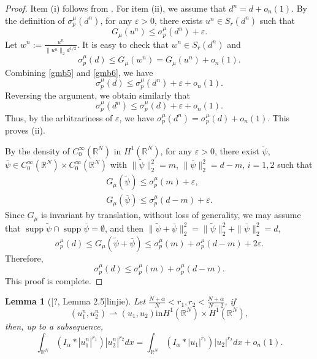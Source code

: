 \documentclass[10pt,a4paper]{amsart}
\numberwithin{equation}{section}
\newtheorem{lemma}[theo]{Lemma}
\begin{document}
\begin{proof}
Item (i) follows from \cite[Theorem 1.2]{ygg}. 
For item (ii), we assume that $d^n=d+o_n(1)$. By the definition of
$\sigma_p^{\mu}(d^n)$, for any $\varepsilon>0$, there exists $u^n\in
 S_r(d^n)$ such that
\begin{equation}\label{gmb5}
 G_\mu(u^n)\leq\sigma_p^{\mu}(d^n)+\varepsilon.
\end{equation}
Let $w^n:=\frac{u^n}{\| u^n \|_2d^{1/2}}$. It is
easy to check that $w^n\in S_r(d^n)$ and
\begin{equation}\label{gmb6}
 \sigma_p^{\mu}(d)\leq G_\mu(w^n)=G_\mu(u^n)+o_n(1).
\end{equation}
Combining \eqref{gmb5} and \eqref{gmb6}, we have
\[
 \sigma_p^{\mu}(d)\leq\sigma_p^{\mu}(d^n)+\varepsilon+o_n(1).
\]
Reversing the argument, we obtain similarly that
\[
\sigma_p^{\mu}(d^n)\leq\sigma_p^{\mu}(d)+\varepsilon+o_n(1).
\]
Thus, by the arbitrariness of $\varepsilon$, we have
$\sigma_p^{\mu}(d^n)=\sigma_p^{\mu}(d)+o_n(1)$. This proves (ii).

By the density of $C_0^{\infty}(\mathbb{R}^N)$ in $H^1(\mathbb{R}^N)$, 
for any $\varepsilon>0$, there exist $\tilde{\psi}$, $\bar{\psi}
 \in C_0^{\infty}(\mathbb{R}^N)\times C_0^{\infty}(\mathbb{R}^N)$ with 
$\| \tilde{\psi}\|_2^2=m$, $\| \bar{\psi}\|_2^2=d-m$,
$i=1,2$ such that
\begin{gather*}
G_\mu(\tilde{\psi})\leq\sigma_p^{\mu}(m)+\varepsilon,\\
G_\mu(\bar{\psi})\leq\sigma_p^{\mu}(d-m)+\varepsilon.
\end{gather*}
Since $G_\mu$ is invariant by translation, without loss of generality, we may assume 
that $\operatorname{supp}\tilde{\psi}\cap \operatorname{supp}\bar{\psi}=\emptyset$, 
and then
 $\| \tilde{\psi}+\bar{\psi}\|_2^2=\| \tilde{\psi}\|_2^2+\|\bar{\psi}\|_2^2=d$,
\[
 \sigma_p^{\mu}(d)\leq G_\mu(\tilde{\psi}+\bar{\psi})\leq\sigma_p^{\mu}(m)+
 \sigma_p^{\mu}(d-m)+2\varepsilon.
\]
Therefore,
\[
 \sigma_p^{\mu}(d)\leq\sigma_p^{\mu}(m)+\sigma_p^{\mu}(d-m).
\]
This proof is complete.
\end{proof}


\begin{lemma}[{[?, Lemma 2.5]linjie}] \label{ph2}
Let $\frac{N+\alpha}{N}<r_1,r_2<\frac{N+\alpha}{N-2}$, if
\[
(u_1^n,u_2^n)\rightharpoonup(u_1,u_2) \text{in} H^1(\mathbb{R}^N)\times H^1(\mathbb{R}^N),
\]
then, up to a subsequence,
\begin{equation}\label{Blm}
 \int_{\mathbb{R}^N}(I_\alpha\ast|u_1^n|^{r_1})|u_2^n|^{r_2}dx
 =\int_{\mathbb{R}^N}(I_\alpha\ast|u_1|^{r_1})|u_2|^{r_2}dx+o_n(1).
\end{equation}
\end{lemma}
\end{document}
